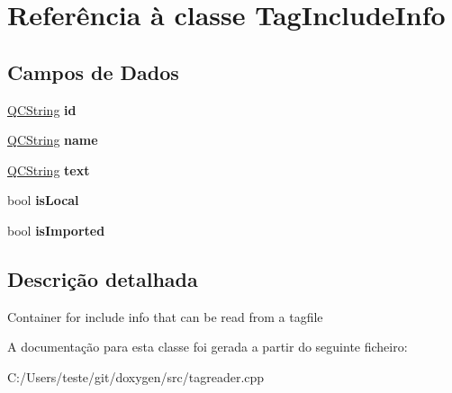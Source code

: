 \hypertarget{class_tag_include_info}{\section{Referência à classe Tag\-Include\-Info}
\label{class_tag_include_info}
}
\subsection*{Campos de Dados}
\begin{DoxyCompactItemize}
\item 
\hypertarget{class_tag_include_info_ac4d9c74c3dc66b375a8567a153a09fc2}{\hyperlink{class_q_c_string}{Q\-C\-String} {\bfseries id}}\label{class_tag_include_info_ac4d9c74c3dc66b375a8567a153a09fc2}

\item 
\hypertarget{class_tag_include_info_adc0097c7bd1e61ad32058fcde425bc7a}{\hyperlink{class_q_c_string}{Q\-C\-String} {\bfseries name}}\label{class_tag_include_info_adc0097c7bd1e61ad32058fcde425bc7a}

\item 
\hypertarget{class_tag_include_info_a4699e75142e13e15b0f7c9ada64258c3}{\hyperlink{class_q_c_string}{Q\-C\-String} {\bfseries text}}\label{class_tag_include_info_a4699e75142e13e15b0f7c9ada64258c3}

\item 
\hypertarget{class_tag_include_info_ac605c13c815eff8fc80f638813621e24}{bool {\bfseries is\-Local}}\label{class_tag_include_info_ac605c13c815eff8fc80f638813621e24}

\item 
\hypertarget{class_tag_include_info_a8bf6d1cdcd87274fa5381e6bee467081}{bool {\bfseries is\-Imported}}\label{class_tag_include_info_a8bf6d1cdcd87274fa5381e6bee467081}

\end{DoxyCompactItemize}


\subsection{Descrição detalhada}
Container for include info that can be read from a tagfile 

A documentação para esta classe foi gerada a partir do seguinte ficheiro\-:\begin{DoxyCompactItemize}
\item 
C\-:/\-Users/teste/git/doxygen/src/tagreader.\-cpp\end{DoxyCompactItemize}
